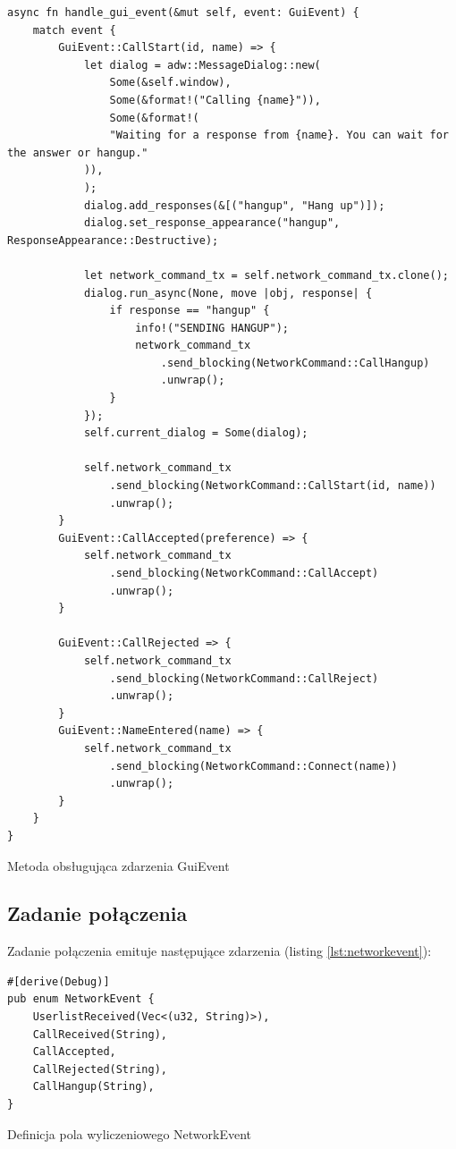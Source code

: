 \begin{listing}[H]
    \begin{verbatim}
async fn handle_gui_event(&mut self, event: GuiEvent) {
    match event {
        GuiEvent::CallStart(id, name) => {
            let dialog = adw::MessageDialog::new(
                Some(&self.window),
                Some(&format!("Calling {name}")),
                Some(&format!(
                "Waiting for a response from {name}. You can wait for the answer or hangup."
            )),
            );
            dialog.add_responses(&[("hangup", "Hang up")]);
            dialog.set_response_appearance("hangup", ResponseAppearance::Destructive);

            let network_command_tx = self.network_command_tx.clone();
            dialog.run_async(None, move |obj, response| {
                if response == "hangup" {
                    info!("SENDING HANGUP");
                    network_command_tx
                        .send_blocking(NetworkCommand::CallHangup)
                        .unwrap();
                }
            });
            self.current_dialog = Some(dialog);

            self.network_command_tx
                .send_blocking(NetworkCommand::CallStart(id, name))
                .unwrap();
        }
        GuiEvent::CallAccepted(preference) => {
            self.network_command_tx
                .send_blocking(NetworkCommand::CallAccept)
                .unwrap();
        }

        GuiEvent::CallRejected => {
            self.network_command_tx
                .send_blocking(NetworkCommand::CallReject)
                .unwrap();
        }
        GuiEvent::NameEntered(name) => {
            self.network_command_tx
                .send_blocking(NetworkCommand::Connect(name))
                .unwrap();
        }
    }
}
\end{verbatim}
    \caption{Metoda obsługująca zdarzenia GuiEvent}
    \label{lst:guievent_handler}
\end{listing}

\subsection{Zadanie połączenia}

Zadanie połączenia emituje następujące zdarzenia (listing \ref{lst:networkevent}):

\begin{listing}[H]
    \begin{verbatim}
#[derive(Debug)]
pub enum NetworkEvent {
    UserlistReceived(Vec<(u32, String)>),
    CallReceived(String),
    CallAccepted,
    CallRejected(String),
    CallHangup(String),
}
\end{verbatim}
    \caption{Definicja pola wyliczeniowego NetworkEvent}
    \label{lst:networkevent}
\end{listing}

